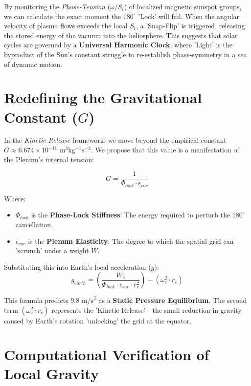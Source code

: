 \documentclass[11pt]{article}
\begin{document}
By monitoring the \textit{Phase-Tension} ($\omega / S_t$) of localized magnetic sunspot groups, we can calculate the exact moment the $180^\circ$ 'Lock' will fail. When the angular velocity of plasma flows exceeds the local $S_t$, a 'Snap-Flip' is triggered, releasing the stored energy of the vacuum into the heliosphere. This suggests that solar cycles are governed by a \textbf{Universal Harmonic Clock}, where 'Light' is the byproduct of the Sun's constant struggle to re-establish phase-symmetry in a sea of dynamic motion.

\section*{Redefining the Gravitational Constant ($G$)}
In the \textit{Kinetic Release} framework, we move beyond the empirical constant $G \approx 6.674 \times 10^{-11} \text{ m}^3\text{kg}^{-1}\text{s}^{-2}$. We propose that this value is a manifestation of the Plenum's internal tension:

\begin{equation}
    G = \frac{1}{\Phi_{lock} \cdot \epsilon_{vac}}
\end{equation}

Where:
\begin{itemize}
    \item $\Phi_{lock}$ is the \textbf{Phase-Lock Stiffness}: The energy required to perturb the $180^\circ$ cancellation.
    \item $\epsilon_{vac}$ is the \textbf{Plenum Elasticity}: The degree to which the spatial grid can 'scrunch' under a weight $W$.
\end{itemize}

Substituting this into Earth's local acceleration ($g$):
\begin{equation}
    g_{earth} = \left( \frac{W_e}{\Phi_{lock} \cdot \epsilon_{vac} \cdot r_e^2} \right) - (\omega_e^2 \cdot r_e)
\end{equation}

This formula predicts $9.8 \text{ m/s}^2$ as a \textbf{Static Pressure Equilibrium}. The second term $(\omega_e^2 \cdot r_e)$ represents the 'Kinetic Release'—the small reduction in gravity caused by Earth's rotation 'unlocking' the grid at the equator.

\section{Computational Verification of Local Gravity}
\end{document}

